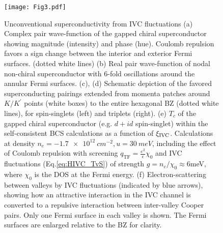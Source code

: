 \documentclass[aps,pra,twocolumn,superscriptaddress,10pt,article,nofootinbib,showpacs,longbibliography]{revtex4-1}
\begin{document}
\begin{figure}
    \centering
    \texttt{[image: Fig3.pdf]}
    \caption{Unconventional superconductivity from IVC fluctuations (a) Complex pair wave-function of the gapped chiral superconductor showing magnitude (intensity) and phase (hue). Coulomb repulsion favors a sign change between the interior and exterior Fermi surfaces. (dotted white lines)
    (b) Real pair wave-function of nodal non-chiral superconductor with 6-fold oscillations around the annular Fermi surfaces.
    (c), (d) Schematic depiction of the favored superconducting pairings extended from momenta patches around $K/K^\prime$ points (white boxes) to the entire hexagonal BZ (dotted white lines), for spin-singlets (left) and triplets (right). 
    (e) $T_c$ of the gapped chiral superconductor (e.g. $d+id$ spin-singlet) within the self-consistent BCS calculations as a function of $\xi_{\rm IVC}$. Calculations at density $n_e = \SI{-1.7e12}{cm^{-2}}, u = \SI{30}{meV}$, including the effect of Coulomb repulsion with screening $q_{\textrm{TF}} = \frac{e^2}{\epsilon} \chi_0 $ and IVC fluctuations (Eq.\eqref{eq:HIVC_TvS}) of strength $g = n_e / \chi_0 \approx 6$meV, where $\chi_0$ is the DOS at the Fermi energy.
    (f) Electron-scattering between valleys by IVC fluctuations (indicated by blue arrows), showing how an attractive interaction in the IVC channel is converted to a repulsive interaction between inter-valley Cooper pairs. Only one Fermi surface in each valley is shown. The Fermi surfaces are enlarged relative to the BZ for clarity.}
    \label{fig:SC}
\end{figure}
\end{document}
